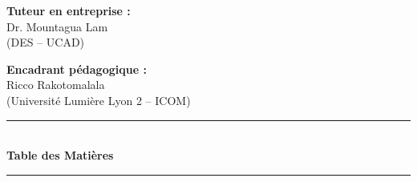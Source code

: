 \documentclass{article}
\begin{document}
\vspace{1.5cm}

\begin{tcolorbox}[colframe=myblue, colback=white, boxrule=0.8pt, arc=4pt, width=0.9\textwidth, left=0.5cm, right=0.5cm]
    \begin{minipage}{0.45\textwidth}
        \raggedright
        \textbf{Tuteur en entreprise :}\\
        Dr. Mountagua Lam\\
        (DES – UCAD)
    \end{minipage}
    \hfill
    \begin{minipage}{0.45\textwidth}
        \raggedleft
        \textbf{Encadrant pédagogique :}\\
        Ricco Rakotomalala\\
        (Université Lumière Lyon 2 – ICOM)
    \end{minipage}
\end{tcolorbox}

\vfill

\newpage

\begin{center}
    \color{myblue}\rule{0.6\textwidth}{3pt}\\[1em]
    {\fontsize{18}{22}\selectfont\bfseries Table des Matières}\\[1em]
    \color{myblue}\rule{0.6\textwidth}{1pt}
\end{center}

\renewcommand{\contentsname}{Table des Matières}
\tableofcontents 

\vspace{1cm}

\end{document}
